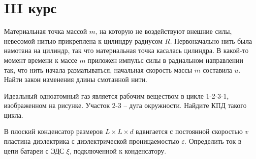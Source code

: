 \section{III курс}

\AddProb Материальная точка массой $m$, на которую не воздействуют внешние силы, 
невесомой нитью прикреплена к цилиндру радиусом $R$. Первоначально нить была 
намотана на цилиндр, так что материальная точка касалась цилиндра. В какой-то 
момент времени к массе $m$ приложен импульс силы в радиальном направлении так, что 
нить начала разматываться, начальная скорость массы $m$ составила $u$. Найти закон 
изменения длины смотанной нити.

\AddProb Идеальный одноатомный газ является рабочим веществом в цикле 1-2-3-1, изображенном на
рисунке. Участок 2-3 -- дуга окружности. Найдите КПД такого цикла.

\AddProb В плоский конденсатор размеров $L\times L\times d$ вдвигается с постоянной скоростью $v$ пластина 
диэлектрика с диэлектрической проницаемостью $\varepsilon$. Определить ток в цепи батареи с ЭДС $\xi$, 
подключенной к конденсатору.